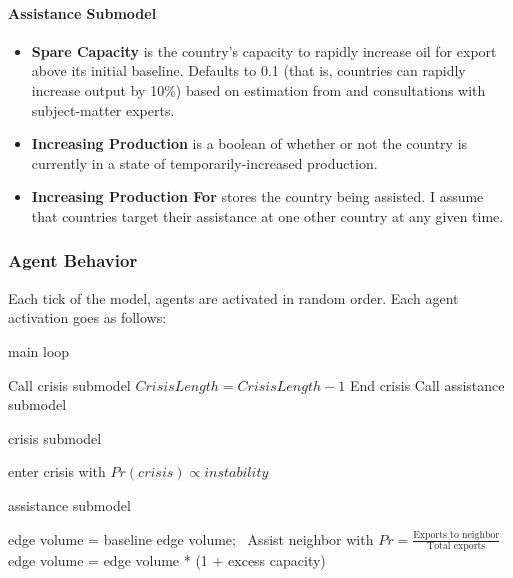 \documentclass{article}
\begin{document}
\paragraph{Assistance Submodel}
\begin{itemize}
	\item \textbf{Spare Capacity} is the country's capacity to rapidly increase oil for export above its initial baseline. Defaults to 0.1 (that is, countries can rapidly increase output by 10\%) based on estimation from \citet{mearns_2012,eia_opec} and  consultations with subject-matter experts. 
	\item \textbf{Increasing Production} is a boolean of whether or not the country is currently in a state of temporarily-increased production.
	\item \textbf{Increasing Production For} stores the country being assisted. I assume that countries target their assistance at one other country at any given time.
	
\end{itemize}

\subsubsection{Agent Behavior}

Each tick of the model, agents are activated in random order. Each agent activation goes as follows:

\begin{algorithm}[H]
	\caption{main loop}
	 {
			Call crisis submodel \;
		}{
			$Crisis Length = Crisis Length - 1$ \;
			 { End crisis \; }
		}
	 {
		Call assistance submodel \;
	}	
\end{algorithm}

\begin{algorithm}[H]
	\caption{crisis submodel}
		enter crisis with $Pr(crisis) \propto instability$ \;
\end{algorithm}


\begin{algorithm}[H]
	\caption{assistance submodel}
	 {
			 {
				 {
					edge volume = baseline edge volume;\
				}
			}
		} {
			 {
				 {
					Assist neighbor with $Pr = \frac{\text{Exports to neighbor}}{\text{Total exports}}$
				}
			}
			 {
				 {
					edge volume = edge volume * (1 + excess capacity)\;
				}
			}
		}

\end{algorithm}
\end{document}
